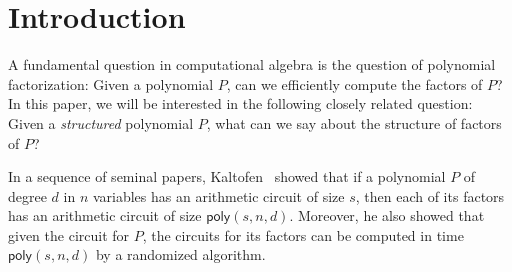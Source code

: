 \documentclass{toc}
\newcommand{\func}[1]{{\ensuremath{\mathsf{#1}}}}
\newcommand{\poly}{\func{poly}}
\begin{document}
\begin{frontmatter}
\begin{abstract}
\begin{itemize}
	\item A factor of degree %
	$d$ of a polynomial $P$ which
can be computed by an arithmetic formula
%
%
%
(or an algebraic branching program) of size $s$ has a formula  %
(an algebraic branching program, resp.)  %
of size %
$\poly(s, d^{\log d}, \deg(P))$.
This result was first shown by Dutta et al. (STOC'18)  
and we obtain a slightly different proof as an easy consequence
of our techniques. 
\end{itemize}
Our proofs rely on a combination of the
%
ideas, based on     %
\emph{Hensel lifting},  %
%
developed in the polynomial factoring literature, and the
depth-reduction  
results for arithmetic circuits, and hold over fields of
characteristic zero
%
or of sufficiently large characteristic.  %
\end{abstract}

%

\end{frontmatter}

\section{Introduction}
A fundamental question in computational algebra is the question of polynomial factorization: %
Given a polynomial $P$, can we efficiently compute the factors of $P$? In this paper, we will be interested in the following closely related
question: %
Given a \emph{structured} polynomial $P$, what can we say about the structure of factors of $P$? 

In a sequence of seminal
%
papers,     %
%
Kaltofen~\cite{kalt85, Kal86, Kal87, k89}
showed that  if a polynomial $P$ of degree $d$ in $n$ variables has an arithmetic circuit of size $s$, then each of its factors has an arithmetic circuit of size $\poly(s, n, d)$. Moreover, he also showed that given the circuit for $P$, the circuits for its factors can be computed in time $\poly(s, n, d)$ by a randomized algorithm. 
\end{document}
